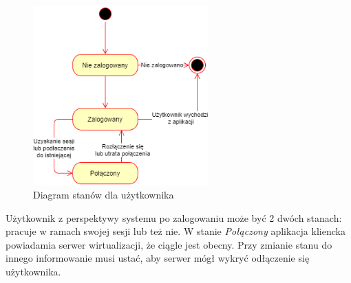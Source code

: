 \documentclass[../opis-rozwiazania.tex]{subfiles}
\begin{document}
\begin{figure}[H]
  \centering
  \includegraphics[width=0.6\textwidth]{../diagrams/state_diagrams/client.png}
  \caption{Diagram stanów dla użytkownika}
  \label{state_user}
\end{figure}

Użytkownik z perspektywy systemu po zalogowaniu może być 2 dwóch stanach: pracuje w ramach swojej sesji lub też nie.
W stanie \textit{Połączony} aplikacja kliencka powiadamia serwer wirtualizacji, że ciągle jest obecny.
Przy zmianie stanu do innego informowanie musi ustać, aby serwer mógł wykryć odłączenie się użytkownika.
\end{document}
